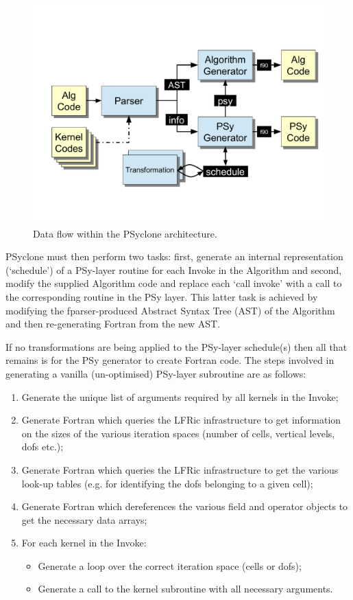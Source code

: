 \documentclass[times]{elsarticle}
\begin{document}
\begin{figure}
\centering\includegraphics[width=0.8\linewidth]{psyclone_flow.pdf}
\caption{\label{fig:psyclone-arch}Data flow within the PSyclone architecture.}
\end{figure}

PSyclone must then perform two tasks: first, generate an internal
representation (`schedule') of a PSy-layer routine for each Invoke in
the Algorithm and second, modify the supplied Algorithm code and
replace each `call invoke' with a call to the corresponding routine in
the PSy layer. This latter task is achieved by modifying the
fparser-produced Abstract Syntax Tree (AST) of the Algorithm and then
re-generating Fortran from the new AST.

If no transformations are being applied to the PSy-layer schedule(s)
then all that remains is for the PSy generator to create Fortran code.
The steps involved in generating a vanilla (un-optimised) PSy-layer
subroutine are as follows:
\begin{enumerate}
\item Generate the unique list of arguments required by all kernels
  in the Invoke;
\item Generate Fortran which queries the LFRic infrastructure to get
  information on the sizes of the various iteration spaces (number of cells,
  vertical levels, dofs etc.);
\item Generate Fortran which queries the LFRic infrastructure to get the various look-up
  tables (e.g. for identifying the dofs belonging to a given cell);
\item Generate Fortran which dereferences the various field and operator objects to get the
  necessary data arrays;
\item For each kernel in the Invoke:
  \begin{itemize}
    \item Generate a loop over the correct iteration space (cells or dofs);
    \item Generate a call to the kernel subroutine with all necessary arguments.
  \end{itemize}
\end{enumerate}
\end{document}
